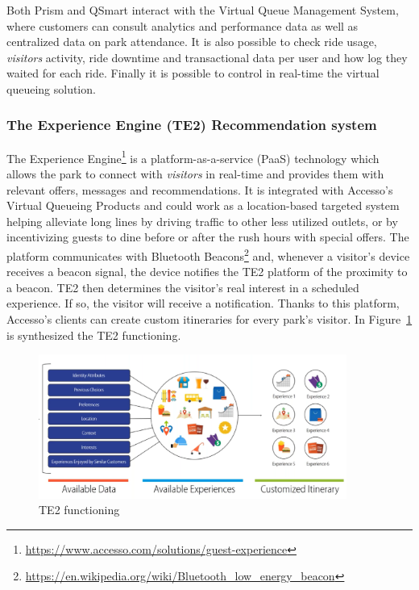 Both Prism and QSmart interact with the Virtual Queue Management System, where customers can consult
analytics and performance data as well as centralized data on park attendance.
It is also possible to check ride usage, \textit{visitors} activity, ride downtime and transactional data per user and how log they waited for each ride.
Finally it is possible to control in real-time the virtual queueing solution.

\subsubsection{The Experience Engine (TE2) Recommendation system}
The Experience Engine\footnote{\url{https://www.accesso.com/solutions/guest-experience}} is a platform-as-a-service (PaaS) technology
which allows the park to connect with \textit{visitors} in real-time and provides them with relevant offers, messages and recommendations.
It is integrated with Accesso's Virtual Queueing Products and could work as a location-based targeted system~\cite{accesso-location-based-exp} helping alleviate
long lines by driving traffic to other less utilized outlets, or by incentivizing guests to dine before or after the rush
hours with special offers.
The platform communicates with Bluetooth Beacons\footnote{\url{https://en.wikipedia.org/wiki/Bluetooth_low_energy_beacon}} and,
whenever a visitor's device receives a beacon signal, the device notifies the TE2 platform of the proximity to a beacon.
TE2 then determines the visitor's real interest in a scheduled experience.
If so, the visitor will receive a notification.
Thanks to this platform, Accesso's clients can create custom itineraries for every park's visitor.
In Figure~\ref{fig:te2ex} is synthesized the TE2 functioning.

\begin{figure}[H]
    \centering
    \includegraphics[width=0.9\textwidth]{img/te2ex}
    \caption{TE2 functioning}
    \label{fig:te2ex}
\end{figure}

